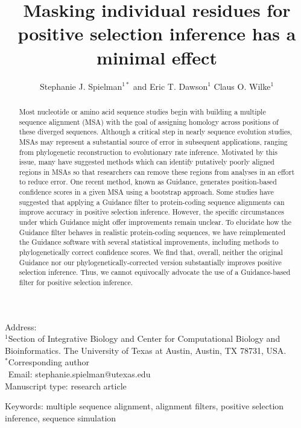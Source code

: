 \documentclass[10pt]{article}
\begin{document}
\title{\textbf{Masking individual residues for positive selection inference has a minimal effect}}
\author{Stephanie J. Spielman$^{1*}$ and Eric T. Dawson$^{1}$ Claus O. Wilke$^{1}$}
\date{}

\maketitle
\noindent
Address:\\
$^1$Section of Integrative Biology and Center for Computational Biology and Bioinformatics. The University
of Texas at Austin, Austin, TX 78731, USA.\\

\bigskip
\noindent
$^*$Corresponding author\\
$\phantom{^*}$Email: stephanie.spielman@utexas.edu\\

\bigskip
\noindent
Manuscript type: research article

\bigskip
\noindent Keywords: multiple sequence alignment, alignment filters, positive selection inference, sequence simulation

\newpage
\begin{abstract}
	Most nucleotide or amino acid sequence studies begin with building a multiple sequence alignment (MSA) with the goal of assigning homology across positions of these diverged sequences. Although a critical step in nearly sequence evolution studies, MSAs may represent a substantial source of error in subsequent applications, ranging from phylogenetic reconstruction to evolutionary rate inference. Motivated by this issue, many have suggested methods which can identify putatively poorly aligned regions in MSAs so that researchers can remove these regions from analyses in an effort to reduce error. One recent method, known as Guidance, generates position-based confidence scores in a given MSA using a bootstrap approach. Some studies have suggested that applying a Guidance filter to protein-coding sequence alignments can improve accuracy in positive selection inference. However, the specific circumstances under which Guidance might offer improvements remain unclear. To elucidate how the Guidance filter behaves in realistic protein-coding sequences, we have reimplemented the Guidance software with several statistical improvements, including methods to phylogenetically correct confidence scores. We find that, overall, neither the original Guidance nor our phylogenetically-corrected version substantially improves positive selection inference. Thus, we cannot equivocally advocate the use of a Guidance-based filter for positive selection inference.
\end{abstract}
\end{document}
